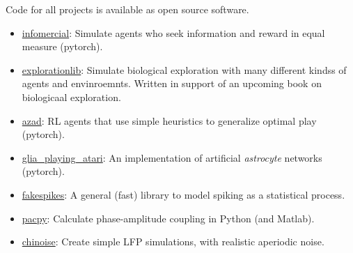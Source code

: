 Code for all projects is available as open source software.

\begin{itemize}
\item
  \href{https://github.com/CoAxLab/infomercial}{infomercial}: Simulate
  agents who seek information and reward in equal measure (pytorch).
\item
  \href{https://github.com/parenthetical-e/explorationlib}{explorationlib}:
  Simulate biological exploration with many different kindss of agents
  and envinroemnts. Written in support of an upcoming book on
  biologicaal exploration.
\item
  \href{https://github.com/CoAxLab/azad}{azad}: RL agents that use
  simple heuristics to generalize optimal play (pytorch).
\item
  \href{https://github.com/CoAxLab/glia_playing_atari}{glia\_playing\_atari}:
  An implementation of artificial \emph{astrocyte} networks (pytorch).
\item
  \href{https://github.com/voytekresearch/fakespikes}{fakespikes}: A
  general (fast) library to model spiking as a statistical process.
\item
  \href{https://github.com/voytekresearch/pacpy}{pacpy}: Calculate
  phase-amplitude coupling in Python (and Matlab).
\item
  \href{https://github.com/voytekresearch/chinoise}{chinoise}: Create
  simple LFP simulations, with realistic aperiodic noise.
\end{itemize}
